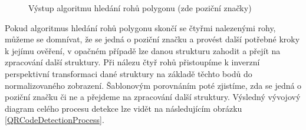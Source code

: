 \begin{figure}[H]
  \begin{center}
    \caption{Výstup algoritmu hledání rohů polygonu (zde poziční značky)}
    \label{SearchCornersOfPolygonAlgorithm}
  \end{center}
\end{figure}

Pokud algoritmus hledání rohů polygonu skončí se čtyřmi nalezenými rohy, můžeme
se domnívat, že se jedná o poziční značku a provést další potřebné kroky k 
jejímu ověření, v opačném případě lze danou strukturu zahodit a přejít na
zpracování další struktury. Při nálezu čtyř rohů přistoupíme k inverzní
perspektivní transformaci dané struktury na základě těchto bodů do
normalizovaného zobrazení. Šablonovým porovnáním poté zjistíme, zda se
jedná o poziční značku či ne a přejdeme na zpracování další struktury. Výsledný
vývojový diagram celého procesu detekce lze vidět na následujícím obrázku
\ref{QRCodeDetectionProcess}.

